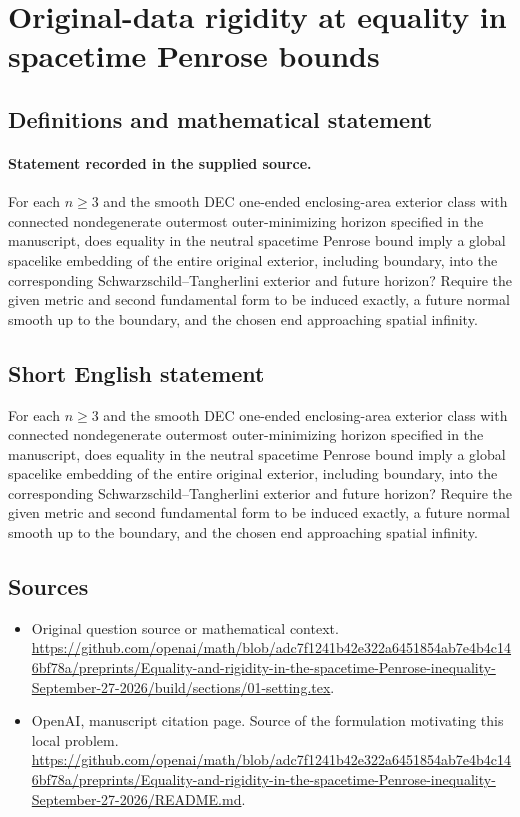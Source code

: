 \documentclass[11pt]{article}
\begin{document}
\section*{Original-data rigidity at equality in spacetime Penrose bounds}\label{30007247}
\subsection{Definitions and mathematical statement}
\paragraph{Statement recorded in the supplied source.}
For each $n\geq 3$ and the smooth DEC one-ended enclosing-area exterior class with connected nondegenerate outermost outer-minimizing horizon specified in the manuscript, does equality in the neutral spacetime Penrose bound imply a global spacelike embedding of the entire original exterior, including boundary, into the corresponding Schwarzschild–Tangherlini exterior and future horizon? Require the given metric and second fundamental form to be induced exactly, a future normal smooth up to the boundary, and the chosen end approaching spatial infinity.
\subsection{Short English statement}
For each $n\geq 3$ and the smooth DEC one-ended enclosing-area exterior class with connected nondegenerate outermost outer-minimizing horizon specified in the manuscript, does equality in the neutral spacetime Penrose bound imply a global spacelike embedding of the entire original exterior, including boundary, into the corresponding Schwarzschild–Tangherlini exterior and future horizon? Require the given metric and second fundamental form to be induced exactly, a future normal smooth up to the boundary, and the chosen end approaching spatial infinity.
\subsection{Sources}
\begin{itemize}
\item[S1] Original question source or mathematical context.
\url{https://github.com/openai/math/blob/adc7f1241b42e322a6451854ab7e4b4c146bf78a/preprints/Equality-and-rigidity-in-the-spacetime-Penrose-inequality-September-27-2026/build/sections/01-setting.tex}.
\item[S2] OpenAI, manuscript citation page. Source of the formulation motivating this local problem.
\url{https://github.com/openai/math/blob/adc7f1241b42e322a6451854ab7e4b4c146bf78a/preprints/Equality-and-rigidity-in-the-spacetime-Penrose-inequality-September-27-2026/README.md}.
\end{itemize}
\end{document}
